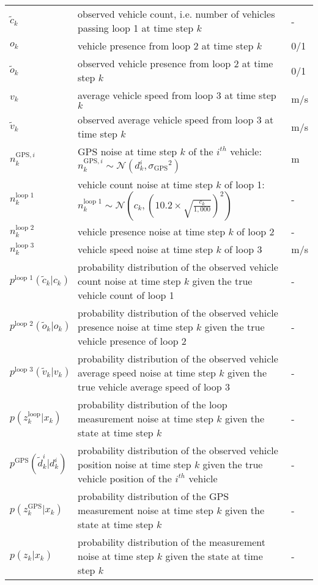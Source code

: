 \begin{longtable}{p{2.5cm}p{10cm}p{2.5cm}}
    $\tilde c_k$ &  observed vehicle count, i.e. number of vehicles passing loop 1 at time step $k$ & -\\
    $ o_k$ & vehicle presence from loop 2 at time step $k$ & 0/1 \\
    $\tilde o_k$ & observed vehicle presence from loop 2 at time step $k$ & 0/1 \\
    $ v_k$ & average vehicle speed from loop 3 at time step $k$ & m/s\\
    $\tilde v_k$ &observed average vehicle speed from loop 3 at time step $k$ & m/s\\
    $n_k^{\text{GPS},i}$ & GPS noise at time step $k$ of the $i^{th}$ vehicle: $n_k^{\text{GPS},i} \sim \mathcal{N}(d_k^i, {\sigma_\text{GPS}}^2) $  & m\\ 
    $n_k^\text{loop 1}$ & vehicle count noise at time step $k$ of loop 1: \( n_k^\text{loop 1} \sim \mathcal{N}(c_k, (10.2 \times \sqrt{\frac{c_k}{1,000}})^2) \) & -\\ 
    $n_k^\text{loop 2}$& vehicle presence noise at time step $k$ of loop 2 & -\\
    $n_k^\text{loop 3}$& vehicle speed noise at time step $k$ of loop 3 & m/s\\
    $p^\text{loop 1}(\tilde c_k | c_{k})$ & probability distribution of the observed vehicle count noise at time step $k$ given the true vehicle count of loop 1 & - \\
    $p^\text{loop 2}(\tilde o_k | o_{k})$ & probability distribution of the observed vehicle presence noise at time step $k$ given the true vehicle presence of loop 2 & - \\
    $p^\text{loop 3}(\tilde v_k | v_{k})$ & probability distribution of the observed vehicle average speed noise at time step $k$ given the true vehicle average speed of loop 3 & - \\
    $p(z_k^\text{loop}| x_k)$ & probability distribution of the loop measurement noise at time step $k$ given the state at time step $k$ & - \\
    $p^\text{GPS}(\tilde d_k^i | d_k^i)$ & probability distribution of the observed vehicle position noise at time step $k$ given the true vehicle position of the $i^{th}$ vehicle & - \\
    $p(z_k^\text{GPS}| x_k)$ & probability distribution of the GPS measurement noise at time step $k$ given the state at time step $k$ & - \\
    $p(z_k | x_{k})$ & probability distribution of the measurement noise at time step $k$ given the state at time step $k$ & - \\

\end{longtable}
